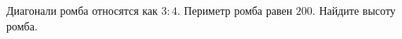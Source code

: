 \begin{ex}
	\begin{condition}
		 Диагонали ромба относятся как \( 3:4 \). Периметр ромба равен \( 200 \). Найдите высоту ромба.
	\end{condition}
\end{ex}